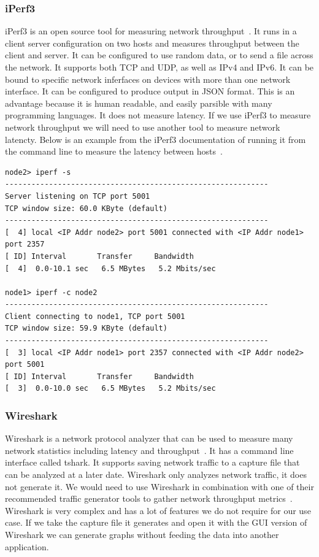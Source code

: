 \documentclass[10pt,letterpaper,onecolumn,draftclsnofoot]{IEEEtran}
\begin{document}
\subsubsection{iPerf3}
iPerf3 is an open source tool for measuring network throughput~\cite{iperf}.
It runs in a client server configuration on two hosts and measures throughput between the client and server.
It can be configured to use random data, or to send a file across the network.
It supports both TCP and UDP, as well as IPv4 and IPv6.
It can be bound to specific network inferfaces on devices with more than one network interface.
It can be configured to produce output in JSON format. 
This is an advantage because it is human readable, and easily parsible with many programming languages.
It does not measure latency. 
If we use iPerf3 to measure network throughput we will need to use another tool to measure network latencty.
Below is an example from the iPerf3 documentation of running it from the command line to measure the latency between hosts~\cite{iperf}.
\begin{lstlisting}[caption = Sample iPerf 3 usage, basicstyle=\ttfamily]
node2> iperf -s
------------------------------------------------------------
Server listening on TCP port 5001
TCP window size: 60.0 KByte (default)
------------------------------------------------------------
[  4] local <IP Addr node2> port 5001 connected with <IP Addr node1> port 2357
[ ID] Interval       Transfer     Bandwidth
[  4]  0.0-10.1 sec   6.5 MBytes   5.2 Mbits/sec

node1> iperf -c node2
------------------------------------------------------------
Client connecting to node1, TCP port 5001
TCP window size: 59.9 KByte (default)
------------------------------------------------------------
[  3] local <IP Addr node1> port 2357 connected with <IP Addr node2> port 5001
[ ID] Interval       Transfer     Bandwidth
[  3]  0.0-10.0 sec   6.5 MBytes   5.2 Mbits/sec
\end{lstlisting}


\subsubsection{Wireshark}
Wireshark is a network protocol analyzer that can be used to measure many network statistics including latency and throughput~\cite{wireshark}. 
It has a command line interface called tshark.
It supports saving network traffic to a capture file that can be analyzed at a later date.
Wireshark only analyzes network traffic, it does not generate it.
We would need to use Wireshark in combination with one of their recommended traffic generator tools to gather network throughput metrics~\cite{wireshark-tools}.
Wireshark is very complex and has a lot of features we do not require for our use case.
If we take the capture file it generates and open it with the GUI version of Wireshark we can generate graphs without feeding the data into another application.
\end{document}
